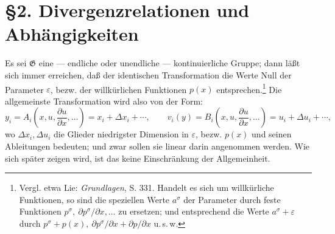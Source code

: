 \documentclass[11pt]{article}
\newcommand{\D}{\Delta}
\providecommand{\eps}{\varepsilon}
\providecommand{\G}{\mathfrak G}
\providecommand{\p}{\partial}
\providecommand{\p}{\partial}
\begin{document}
\section*{\S{}2. Divergenzrelationen und Abhängigkeiten}

Es sei \(\G\) eine --- endliche oder unendliche --- kontinuierliche Gruppe; dann läßt sich immer erreichen, daß der identischen Transformation die Werte Null der Parameter \(\eps\), bezw. der willkürlichen Funktionen \(p(x)\) entsprechen.\footnote{Vergl. etwa Lie: \emph{Grundlagen}, S. 331. Handelt es sich um willkürliche Funktionen, so sind die speziellen Werte \(a^\sigma\) der Parameter durch feste Funktionen \(p^\sigma,\ \p p^\sigma/\p x,\ldots\) zu ersetzen; und entsprechend die Werte \(a^\sigma+\eps\) durch \(p^\sigma+p(x),\ \p p^\sigma/\p x+\p p/\p x\) u.\,s.\,w.} Die allgemeinste Transformation wird also von der Form:
\[
y_i=A_i\!\left(x,u,\frac{\p u}{\p x},\ldots\right)=x_i+\D x_i+\cdots,\qquad
v_i(y)=B_i\!\left(x,u,\frac{\p u}{\p x},\ldots\right)=u_i+\D u_i+\cdots,
\]
wo \(\D x_i,\D u_i\) die Glieder niedrigster Dimension in \(\eps\), bezw. \(p(x)\) und seinen Ableitungen bedeuten; und zwar sollen sie linear darin angenommen werden. Wie sich später zeigen wird, ist das keine Einschränkung der Allgemeinheit.
\end{document}
